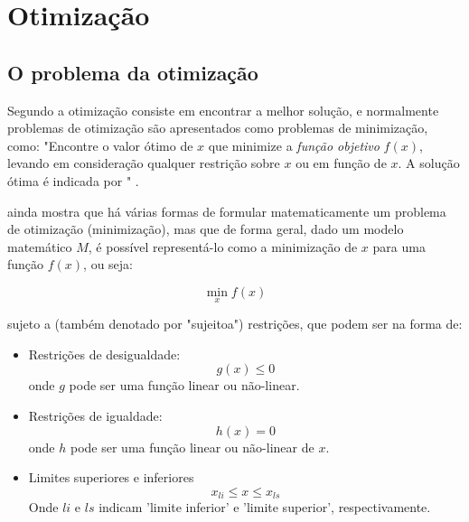 \chapter{Otimização}
\label{otimizacao}

\section{O problema da otimização}

Segundo  a otimização consiste em encontrar a melhor solução, e normalmente problemas de otimização são apresentados como problemas de minimização, como: "Encontre o valor ótimo de $x$ que minimize a \textit{função objetivo} $f(x)$, levando em consideração qualquer restrição sobre $x$ ou em função de $x$. A solução ótima é indicada por " \cite{Haugen2018}.

 ainda mostra que há várias formas de formular matematicamente um problema de otimização (minimização), mas que de forma geral, dado um modelo matemático $M$, é possível representá-lo como a minimização de $x$ para uma função $f(x)$, ou seja:

\begin{equation}
\min_{x} f(x)
\end{equation}

sujeto a (também denotado por "\acrshort{sujeitoa}") restrições, que podem ser na forma de:

\begin{itemize}
\item Restrições de desigualdade:
	\begin{equation}
	\label{min_restr_desigualdade}
	g(x) \leq 0
	\end{equation}
	onde $g$ pode ser uma função linear ou não-linear.
	
\item Restrições de igualdade:
	\begin{equation}
	\label{min_restr_igualdade}
	h(x) = 0
	\end{equation}
	onde $h$ pode ser uma função linear ou não-linear de $x$.
	
\item Limites superiores e inferiores
	\begin{equation}
	\label{min_limites}
	x_{li} \leq x \leq x_{ls}
	\end{equation}
	Onde $li$ e $ls$ indicam 'limite inferior' e 'limite superior', respectivamente.
\end{itemize}

